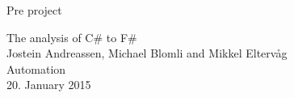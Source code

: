 \documentclass[12pt, a4paper]{article}
\begin{document}
\begin{titlepage}

\Large Pre project \\

\vspace{3cm}

\begin{center}
\Huge The analysis of C\# to F\# \vspace{10mm}\\
\large Jostein Andreassen, Michael Blomli and Mikkel Eltervåg \vspace{3mm}\\
Automation \vspace{5mm}\\
20. January 2015
\end{center}

\vspace{5cm}


\end{titlepage}
\end{document}
